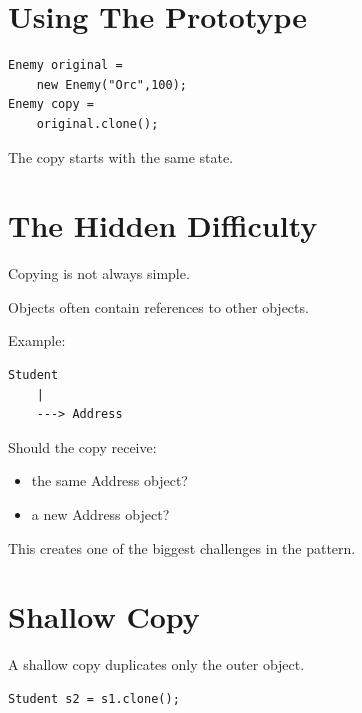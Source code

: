 \documentclass[11pt,a4paper]{book}
\begin{document}

\section{Using The Prototype}

\begin{verbatim}
Enemy original =
    new Enemy("Orc",100);
Enemy copy =
    original.clone();
\end{verbatim}

The copy starts with the same state.


\section{The Hidden Difficulty}

\begin{trap}

Copying is not always simple.

Objects often contain references to
other objects.

\end{trap}

Example:

\begin{verbatim}
Student
    |
    ---> Address
\end{verbatim}

Should the copy receive:

\begin{itemize}

\item the same Address object?
\item a new Address object?
\end{itemize}

This creates one of the biggest challenges
in the pattern.


\section{Shallow Copy}

A shallow copy duplicates only the outer object.

\begin{verbatim}
Student s2 = s1.clone();
\end{verbatim}
\end{document}
